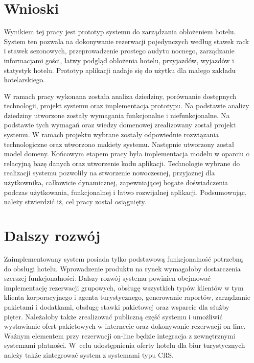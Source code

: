 \documentclass[a4paper,onecolumn,oneside,11pt,wide,floatssmall]{mwrep}
\theoremstyle{definition}
\theoremstyle{plain}%
\theoremstyle{remark}
\begin{document}
\section{Wnioski}
Wynikiem tej pracy jest prototyp systemu do zarządzania obłożeniem hotelu.
System ten pozwala na dokonywanie rezerwacji pojedynczych według stawek rack i stawek sezonowych, przeprowadzenie prostego audytu nocnego, zarządzanie informacjami gości, łatwy podgląd obłożenia hotelu, przyjazdów, wyjazdów i statystyk hotelu. Prototyp aplikacji nadaje się do użytku dla małego zakładu hotelarskiego.

W ramach pracy wykonana została analiza dziedziny, porównanie dostępnych technologii, projekt systemu oraz implementacja prototypu. Na podstawie analizy dziedziny utworzone zostały wymagania funkcjonalne i niefunkcjonalne. Na podstawie tych wymagań oraz wiedzy domenowej zrealizowany został projekt systemu. W ramach projektu wybrane zostały odpowiednie rozwiązania technologiczne oraz utworzono makiety systemu. Następnie utworzony został model domeny. Końcowym etapem pracy była implementacja modelu w oparciu o relacyjną bazę danych oraz utworzenie kodu aplikacji. Technologie wybrane do realizacji systemu pozwoliły na stworzenie nowoczesnej, przyjaznej dla użytkownika, całkowicie dynamicznej, zapewniającej bogate doświadczenia podczas użytkowania, funkcjonalnej i łatwo rozwijalnej aplikacji. Podsumowując, należy stwierdzić iż, cel pracy został osiągnięty.

\section{Dalszy rozwój}
Zaimplementowany system posiada tylko podstawową funkcjonalność potrzebną do obsługi hotelu. Wprowadzenie produktu na rynek wymagałoby dostarczenia szerszej funkcjonalności. Dalszy rozwój systemu powinien obejmować implementację rezerwacji grupowych, obsługę wszystkich typów klientów w tym klienta korporacyjnego i agenta turystycznego, generowanie raportów, zarządzanie pakietami i dodatkami, obsługę stawki pakietowej oraz wsparcie dla służby pięter. Należałoby także zrealizować publiczną część systemu i umożliwić wystawianie ofert pakietowych w internecie oraz dokonywanie rezerwacji on-line. Ważnym elementem przy rezerwacji on-line będzie integracja z zewnętrznymi systemami płatności. \mbox{W celu} udostępnienia oferty hotelu dla biur turystycznych należy także zintegrować system z systemami typu CRS.
\end{document}
